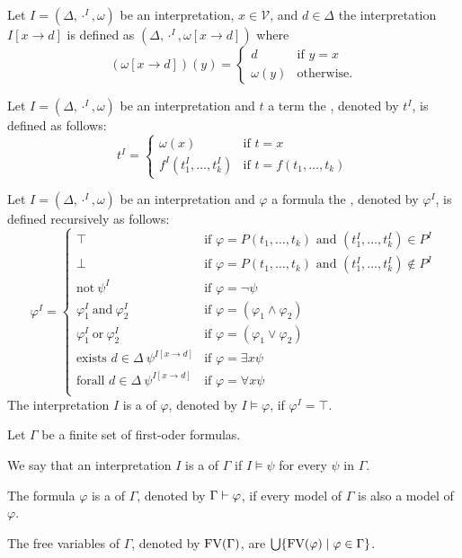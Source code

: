 Let $I=(\Delta,\cdot^I,\omega)$ be an interpretation, $x\in\mathcal{V}$, and $d\in\Delta$ the interpretation $I\left[x\to d\right]$ is defined as $(\Delta,\cdot^I,\omega\left[x\to d\right])$ where
\[(\omega\left[x\to d\right])(y)=
\begin{cases}
d & \text{if $y=x$}\\
\omega(y) & \text{otherwise.}
\end{cases}\]
\begin{definition}
Let $I=(\Delta,\cdot^I,\omega)$ be an interpretation and $t$ a term the , denoted by $t^I$, is defined as follows:
\[t^I=
\begin{cases}
\omega(x) & \text{if $t=x$}\\
f^I(t^I_1,\dots,t^I_k) & \text{if $t=f(t_1,\dots,t_k)$}
\end{cases}\]
\end{definition}
\begin{definition}
Let $I=(\Delta,\cdot^I,\omega)$ be an interpretation and $\varphi$ a formula the , denoted by $\varphi^I$, is defined recursively as follows:
\[\varphi^I=
\begin{cases}
\top & \text{if $\varphi=P(t_1,\dots,t_k)$ and $(t^I_1,\dots,t^I_k)\in P^I$}\\
\bot & \text{if $\varphi=P(t_1,\dots,t_k)$ and $(t^I_1,\dots,t^I_k)\notin P^I$}\\
\text{not}~\psi^I & \text{if $\varphi=\neg\psi$}\\
\varphi^I_1~\text{and}~\varphi^I_2 & \text{if $\varphi=(\varphi_1\wedge\varphi_2)$}\\
\varphi^I_1~\text{or}~\varphi^I_2 & \text{if $\varphi=(\varphi_1\vee\varphi_2)$}\\
\text{exists $d\in\Delta$}~\psi^{I\left[x\to d\right]} & \text{if $\varphi=\exists x\psi$}\\
\text{forall $d\in\Delta$}~\psi^{I\left[x\to d\right]} & \text{if $\varphi=\forall x\psi$}\\
\end{cases}\]
The interpretation $I$ is a  of $\varphi$, denoted by $I\models\varphi$, if $\varphi^I=\top$.
\end{definition}
\begin{definition} %
Let $\Gamma$ be a finite set of first-oder formulas.
\begin{description}
\item We say that an interpretation $I$ is a  of $\Gamma$ if $I\models\psi$ for every $\psi$ in $\Gamma$.
\item The formula $\varphi$ is a  of $\Gamma$, denoted by $\Gamma\vdash\varphi$, if every model of $\Gamma$ is also a model of $\varphi$.
\item The free variables of $\Gamma$, denoted by $\text{FV}(\Gamma)$, are $\bigcup\{\text{FV}(\varphi)\mid \varphi\in \Gamma\}$.
\end{description}
\end{definition}